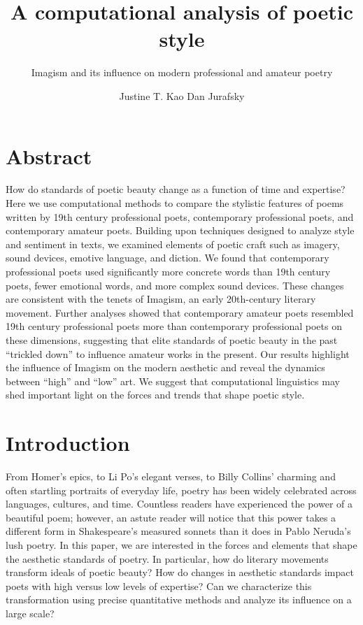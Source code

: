 \documentclass{book}
\title       {A computational analysis of poetic style}
\subtitle{Imagism and its influence on modern professional and amateur poetry}
\author      {Justine T. Kao\affiliation{Department of Psychology, Stanford University} {Dan Jurafsky\affiliation{Department of Linguistics, Stanford University}}}
\begin{document}
\section*{Abstract}
How do standards of poetic beauty change as a function of time and expertise? Here we use computational methods to compare the stylistic features of poems written by 19th century professional poets, contemporary professional poets, and contemporary amateur poets. Building upon techniques designed to analyze style and sentiment in texts, we examined elements of poetic craft such as imagery, sound devices, emotive language, and diction. We found that contemporary professional poets used significantly more concrete words than 19th century poets, fewer emotional words, and more complex sound devices. These changes are consistent with the tenets of Imagism, an early 20th-century literary movement. Further analyses showed that contemporary amateur poets resembled 19th century professional poets more than contemporary professional poets on these dimensions, suggesting that elite standards of poetic beauty in the past ``trickled down'' to influence amateur works in the present. Our results highlight the influence of Imagism on the modern aesthetic and reveal the dynamics between ``high'' and ``low'' art. We suggest that computational linguistics may shed important light on the forces and trends that shape poetic style.

\clearpage

\section{Introduction} 
From Homer's epics, to Li Po's elegant verses, to Billy Collins' charming and often startling portraits of everyday life, poetry has been widely celebrated across languages, cultures, and time. Countless readers have experienced the power of a beautiful poem; however, an astute reader will notice that this power takes a different form in Shakespeare's measured sonnets than it does in Pablo Neruda's lush poetry. In this paper, we are interested in the forces and elements that shape the aesthetic standards of poetry. In particular, how do literary movements transform ideals of poetic beauty? How do changes in aesthetic standards impact poets with high versus low levels of expertise? Can we characterize this transformation using precise quantitative methods and analyze its influence on a large scale? 
\end{document}

